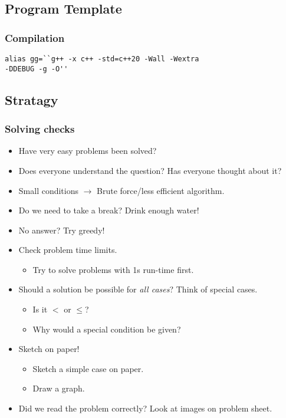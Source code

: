 

\subsection{Program Template}


\subsubsection{Compilation}
\begin{verbatim}
alias gg=``g++ -x c++ -std=c++20 -Wall -Wextra
-DDEBUG -g -O''
\end{verbatim}

\newpage

\subsection{Stratagy}

\subsubsection{Solving checks}
\begin{itemize}
    \item Have very easy problems been solved?
    \item Does everyone understand the question? Has everyone thought about it?
    \item Small conditions $\rightarrow$ Brute force/less efficient algorithm.
    \item Do we need to take a break? Drink enough water!
    \item No answer? Try greedy!
    \item Check problem time limits.
    \begin{itemize}
        \item Try to solve problems with 1s run-time first.
    \end{itemize}
    \item Should a solution be possible for \textit{all cases}? Think of special cases.
    \begin{itemize}
        \item Is it $<$ or $\leq$?
        \item Why would a special condition be given?
    \end{itemize}
    \item Sketch on paper!
    \begin{itemize}
        \item Sketch a simple case on paper.
        \item Draw a graph.
    \end{itemize}
    \item Did we read the problem correctly? Look at images on problem sheet.
\end{itemize}

